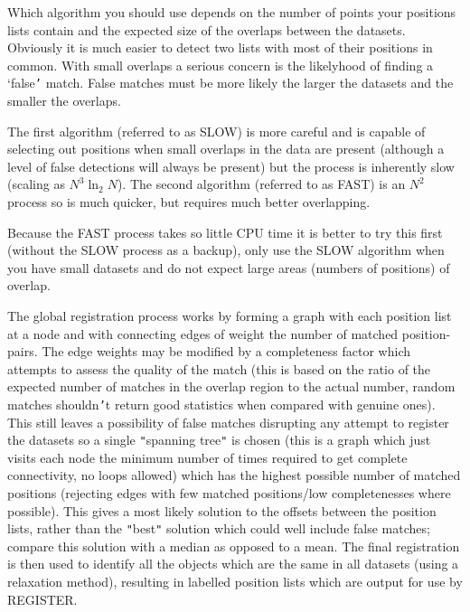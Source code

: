 {{      Which algorithm you should use depends on the number of points
      your positions lists contain and the expected size of the overlaps
      between the datasets. Obviously it is much easier to detect two
      lists with most of their positions in common. With small overlaps
      a serious concern is the likelyhood of finding a `false{\tt '} match.
      False matches must be more likely the larger the datasets and the
      smaller the overlaps.

      The first algorithm (referred to as SLOW) is more careful and is
      capable of selecting out positions when small overlaps in the
      data are present (although a level of false detections will
      always be present) but the process is inherently slow (scaling as
      $N^{3}\ln_{2}N$).  The second algorithm (referred to as FAST) is an
      $N^2$ process so is much quicker, but requires much better
      overlapping.

      Because the FAST process takes so little CPU time it is better to
      try this first (without the SLOW process as a backup), only use
      the SLOW algorithm when you have small datasets and do not
      expect large areas (numbers of positions) of overlap.

      The global registration process works by forming a graph with
      each position list at a node and with connecting edges of weight
      the number of matched position-pairs. The edge weights may be
      modified by a completeness factor which attempts to assess the
      quality of the match (this is based on the ratio of the expected
      number of matches in the overlap region to the actual number,
      random matches shouldn{\tt '}t return good statistics when compared
      with genuine ones). This still leaves a possibility of false
      matches disrupting any attempt to register the datasets so a
      single {\tt "}spanning tree{\tt "} is chosen (this is a graph which just
      visits each node the minimum number of times required to get
      complete connectivity, no loops allowed) which has the highest
      possible number of matched positions (rejecting edges with few
      matched positions/low completenesses where possible). This gives
      a most likely solution to the offsets between the position lists,
      rather than the {\tt "}best{\tt "} solution which could well include false
      matches; compare this solution with a median as opposed to a
      mean. The final registration is then used to identify all the
      objects which are the same in all datasets (using a relaxation
      method), resulting in labelled position lists which are output
      for use by REGISTER.
   }
   }
